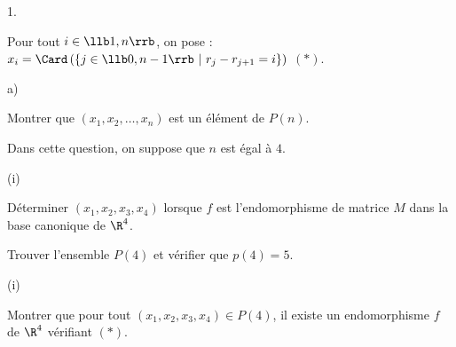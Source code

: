 \documentclass[11pt]{article}%
\begin{document}






\begin{noliste}{1.}
  \setlength{\itemsep}{4mm}
  \setcounter{enumi}{2}
\item Pour tout $i \in \llb 1,n \rrb$, on pose : $x_i= \Card\left(\{j
    \in \llb 0, n-1 \rrb \ | \ r_j-r_{j+1}=i\} \right)$ \quad $(*)$.
  \begin{noliste}{a)}
    \setlength{\itemsep}{2mm}
    \item Montrer que $(x_1,x_2, \ldots,x_n)$ est un élément de 
    $P(n)$.

    




  \item Dans cette question, on suppose que $n$ est égal à $4$.
  \end{noliste}
    \begin{noliste}{(i)}
    \item Déterminer $(x_1,x_2,x_3,x_4)$ lorsque $f$ est
      l'endomorphisme de matrice $M$ dans la base canonique
      \nolinebreak de $\R^4$.

      
      
    \item Trouver l'ensemble $P(4)$ et vérifier que $p(4)=5$.
    \end{noliste}

    




    \begin{noliste}{(i)}
      \setcounter{enumii}{2}
    \item Montrer que pour tout $(x_1,x_2,x_3,x_4) \in P(4)$, il
      existe un endomorphisme $f$ de $\R^4$ vérifiant \nolinebreak
      $(*)$.

      
    \end{noliste}
  \end{noliste}


\end{document}
